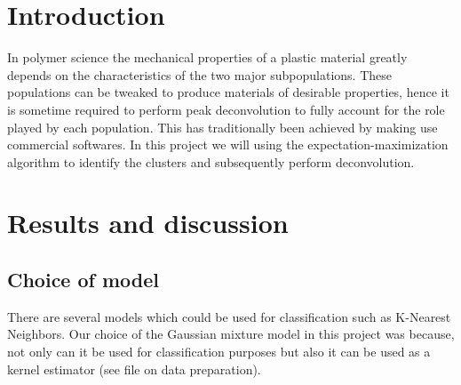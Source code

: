 \documentclass[12pt,letter]{article}
\begin{document}
\section*{Introduction}
In polymer science the mechanical properties of a plastic material greatly depends on the characteristics of the two major subpopulations. These populations can be tweaked to produce materials of desirable properties, hence it is sometime required to perform peak deconvolution to fully account for the role played by each population. This has traditionally been achieved by making use commercial softwares. In this project we will using the expectation-maximization algorithm to identify the clusters and subsequently perform deconvolution.
\section*{Results and discussion}
\subsection*{Choice of model}
There are several models which could be used for classification such as K-Nearest Neighbors. Our choice of the Gaussian mixture model in this project was because, not only can it be used for classification purposes but also it can be used as a kernel estimator (see file on data preparation).
\end{document}
